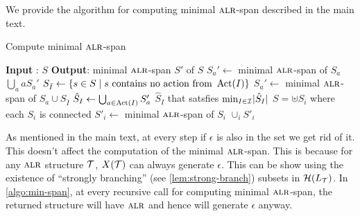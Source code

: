 We provide the algorithm for computing minimal $\textsc{alr}$-span described in the main text. 
\begin{algorithm}[H]
\caption{Compute minimal $\textsc{alr}$-span}
\label{algo:min-span}
\begin{algorithmic}[1]
\STATE \textbf{Input} : $S$ 
\STATE \textbf{Output}: minimal $\textsc{alr}$-span $S'$ of $S$ 
 
\STATE $S_a' \gets $ minimal $\textsc{alr}$-span of $S_a$\ENDFOR
\RETURN $\bigcup_{a} aS_a'$ 
\ELSE 
{}
\STATE $S_{\bar{I}} \gets \{ s \in S \mid s \text{ contains no action from } \operatorname{Act}(I) \}$
\STATE $S_a' \gets $ minimal $\textsc{alr}$-span of $S_a \cup S_{\bar{I}}$
\ENDFOR
\STATE $\hat{S}_I \gets \bigcup_{a \in \operatorname{Act}(I)} S'_a$
\ENDFOR
\RETURN $\hat{S}_I$ that satsfies $\min_{I \in \mathcal{I}}  \lvert \hat{S}_I \rvert $ \label{algo:min-span-all}
\ENDIF
\ELSE
\STATE $S = \uplus S_i$ where each $S_i$ is connected 
\STATE $S'_i \gets $ minimal $\textsc{alr}$-span of $S_i$ \label{algo:min-span-disconnected}
\RETURN $\cup_i S'_i$
\ENDIF
\end{algorithmic} 
\end{algorithm}



As mentioned in the main text, at every step if $\epsilon$ is also in the set we get rid of it. This doesn't affect the computation of the minimal $\textsc{alr}$-span. This is because for any $\textsc{alr}$ structure $\mathcal{T}$, $X(\mathcal{T})$ can always generate $\epsilon$. This can be show using the existence of ``strongly branching'' (see \cref{lem:strong-branch}) subsets in $\mathcal{H}(L_{\mathcal{T}})$. In \cref{algo:min-span}, at every recursive call for computing minimal $\textsc{alr}$-span, the returned structure will have $\textsc{alr}$ and hence will generate $\epsilon$ anyway. 

\spanLowerBound*

